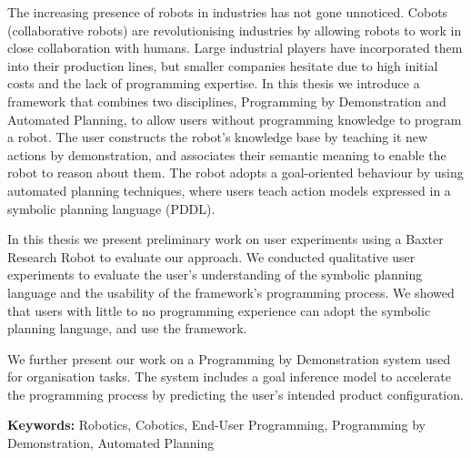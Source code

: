 The increasing presence of robots in industries has not gone unnoticed. 
Cobots (collaborative robots) are revolutionising industries by allowing robots to work in close collaboration with humans.
Large industrial players have incorporated them into their production lines, but smaller companies hesitate due to high initial costs and the lack of programming expertise. 
In this thesis we introduce a framework that combines two disciplines, Programming by Demonstration and Automated Planning, to allow users without programming knowledge to program a robot. 
The user constructs the robot's knowledge base by teaching it new actions by demonstration, and associates their semantic meaning to enable the robot to reason about them. 
The robot adopts a goal-oriented behaviour by using automated planning techniques, where users teach action models expressed in a symbolic planning language (PDDL).

In this thesis we present preliminary work on user experiments using a Baxter Research Robot to evaluate our approach.
We conducted qualitative user experiments to evaluate the user's understanding of the symbolic planning language and the usability of the framework's programming process.
We showed that users with little to no programming experience can adopt the symbolic planning language, and use the framework.

We further present our work on a Programming by Demonstration system used for organisation tasks.
The system includes a goal inference model to accelerate the programming process by predicting the user's intended product configuration.

\textbf{Keywords:} Robotics, Cobotics, End-User Programming, Programming by Demonstration, Automated Planning
